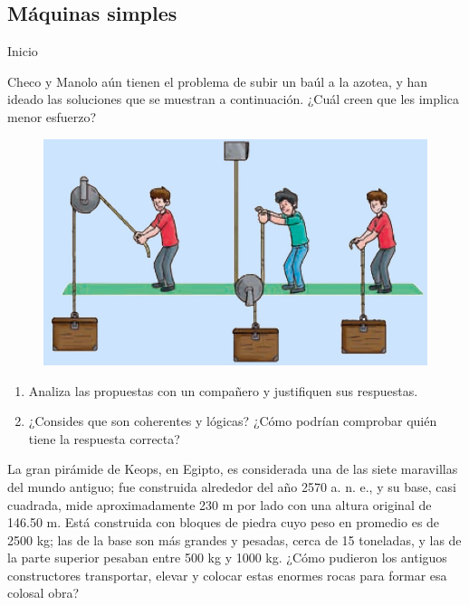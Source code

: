 \documentclass[11pt]{book}
\begin{document}
\subsection{M\'aquinas simples}
\begin{boxF}
  \begin{center}\color{colorrds}\large Inicio\end{center}

  Checo y Manolo aún tienen el problema de subir un baúl a la azotea, y han ideado
  las soluciones que se muestran a continuación. ¿Cuál creen que les implica menor esfuerzo?
  \begin{figure}[H]
    \centering
    \includegraphics[width=\linewidth]{maq_inicio.jpg}
  \end{figure}
  \begin{enumerate}
    \item Analiza las propuestas con un compañero y justifiquen sus respuestas.
    \item ¿Consides que son coherentes y lógicas? ¿Cómo podrían comprobar qui\'en
          tiene la respuesta correcta?
  \end{enumerate}
\end{boxF}

La gran pirámide de Keops, en Egipto, es considerada una de las siete maravillas
del mundo antiguo; fue construida alrededor del año 2570 a. n. e., y su base, casi
cuadrada, mide aproximadamente 230 m por lado con una altura original de 146.50 m.
Está construida con bloques de piedra cuyo peso en promedio es de 2500 kg; las
de la base son más grandes y pesadas, cerca de 15 toneladas, y las de la parte
superior pesaban entre 500 kg y 1000 kg. ¿Cómo pudieron los antiguos constructores
transportar, elevar y colocar estas enormes rocas para formar esa colosal obra?\\
\end{document}
